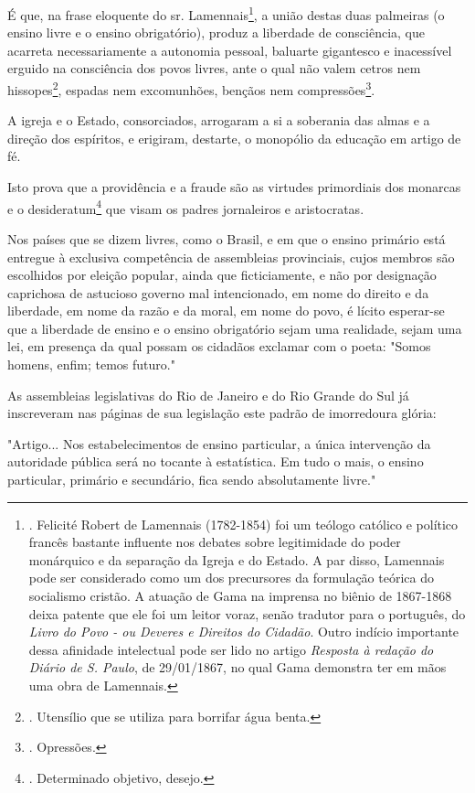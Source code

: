É que, na frase eloquente do sr. Lamennais\footnote{. Felicité Robert de
  Lamennais (1782-1854) foi um teólogo católico e político francês
  bastante influente nos debates sobre legitimidade do poder monárquico
  e da separação da Igreja e do Estado. A par disso, Lamennais pode ser
  considerado como um dos precursores da formulação teórica do
  socialismo cristão. A atuação de Gama na imprensa no biênio de
  1867-1868 deixa patente que ele foi um leitor voraz, senão tradutor
  para o português, do \emph{Livro do Povo - ou Deveres e Direitos do
  Cidadão}. Outro indício importante dessa afinidade intelectual pode
  ser lido no artigo \emph{Resposta à redação do Diário de S. Paulo}, de
  29/01/1867, no qual Gama demonstra ter em mãos uma obra de Lamennais.},
a união destas duas palmeiras (o ensino livre e o ensino obrigatório),
produz a liberdade de consciência, que acarreta necessariamente a
autonomia pessoal, baluarte gigantesco e inacessível erguido na
consciência dos povos livres, ante o qual não valem cetros nem
hissopes\footnote{. Utensílio que se utiliza para borrifar água benta.},
espadas nem excomunhões, bençãos nem compressões\footnote{. Opressões.}.

A igreja e o Estado, consorciados, arrogaram a si a soberania das almas
e a direção dos espíritos, e erigiram, destarte, o monopólio da educação
em artigo de fé.

Isto prova que a providência e a fraude são as virtudes primordiais dos
monarcas e o desideratum\footnote{. Determinado objetivo, desejo.} que
visam os padres jornaleiros e aristocratas.

Nos países que se dizem livres, como o Brasil, e em que o ensino
primário está entregue à exclusiva competência de assembleias
provinciais, cujos membros são escolhidos por eleição popular, ainda que
ficticiamente, e não por designação caprichosa de astucioso governo mal
intencionado, em nome do direito e da liberdade, em nome da razão e da
moral, em nome do povo, é lícito esperar-se que a liberdade de ensino e
o ensino obrigatório sejam uma realidade, sejam uma lei, em presença da
qual possam os cidadãos exclamar com o poeta: "Somos homens, enfim;
temos futuro."

As assembleias legislativas do Rio de Janeiro e do Rio Grande do Sul já
inscreveram nas páginas de sua legislação este padrão de imorredoura
glória:

"Artigo... Nos estabelecimentos de ensino particular, a única
intervenção da autoridade pública será no tocante à estatística. Em tudo
o mais, o ensino particular, primário e secundário, fica sendo
absolutamente livre."

